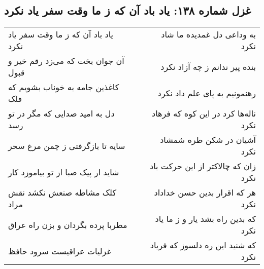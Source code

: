 \begin{center}
\section*{غزل شماره ۱۳۸: یاد باد آن که ز ما وقت سفر یاد نکرد}
\label{sec:sh138}
\begin{longtable}{l p{0.5cm} r}
یاد باد آن که ز ما وقت سفر یاد نکرد
&&
به وداعی دل غمدیده ما شاد نکرد
\\
آن جوان بخت که می‌زد رقم خیر و قبول
&&
بنده پیر ندانم ز چه آزاد نکرد
\\
کاغذین جامه به خوناب بشویم که فلک
&&
رهنمونیم به پای علم داد نکرد
\\
دل به امید صدایی که مگر در تو رسد
&&
ناله‌ها کرد در این کوه که فرهاد نکرد
\\
سایه تا بازگرفتی ز چمن مرغ سحر
&&
آشیان در شکن طره شمشاد نکرد
\\
شاید ار پیک صبا از تو بیاموزد کار
&&
زان که چالاکتر از این حرکت باد نکرد
\\
کلک مشاطه صنعش نکشد نقش مراد
&&
هر که اقرار بدین حسن خداداد نکرد
\\
مطربا پرده بگردان و بزن راه عراق
&&
که بدین راه بشد یار و ز ما یاد نکرد
\\
غزلیات عراقیست سرود حافظ
&&
که شنید این ره دلسوز که فریاد نکرد
\\
\end{longtable}
\end{center}
